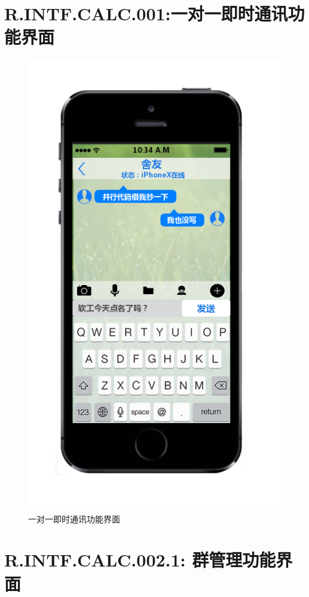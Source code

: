     \section{R.INTF.CALC.001:一对一即时通讯功能界面}
    \begin{figure}[h]
        \centering
        \includegraphics[scale=0.9]{OutlineDesign/figures/一对一即时通讯功能界面.png}
        \caption{一对一即时通讯功能界面}
        \label{fig:server_flow}
    \end{figure}
    \newpage
    \section{R.INTF.CALC.002.1: 群管理功能界面}
    

